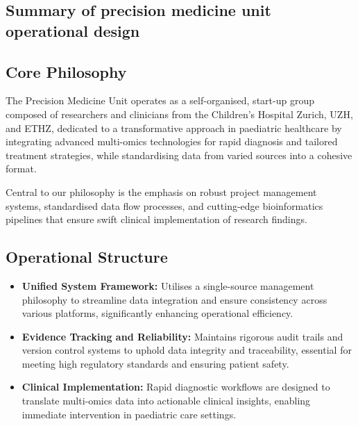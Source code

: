  \subsection{Summary of  precision medicine unit operational design}
\subsection*{Core Philosophy}
The Precision Medicine Unit operates as a self-organised, start-up group composed of researchers and clinicians from the Children's Hospital Zurich, UZH, and ETHZ, dedicated to a transformative approach in paediatric healthcare by integrating advanced multi-omics technologies for rapid diagnosis and tailored treatment strategies, while standardising data from varied sources into a cohesive format.

Central to our philosophy is the emphasis on robust project management systems, standardised data flow processes, and cutting-edge bioinformatics pipelines that ensure swift clinical implementation of research findings.

\subsection*{Operational Structure}
\begin{itemize}
    \item \textbf{Unified System Framework:} Utilises a single-source management philosophy to streamline data integration and ensure consistency across various platforms, significantly enhancing operational efficiency.
    \item \textbf{Evidence Tracking and Reliability:} Maintains rigorous audit trails and version control systems to uphold data integrity and traceability, essential for meeting high regulatory standards and ensuring patient safety.
    \item \textbf{Clinical Implementation:} Rapid diagnostic workflows are designed to translate multi-omics data into actionable clinical insights, enabling immediate intervention in paediatric care settings.
\end{itemize}

